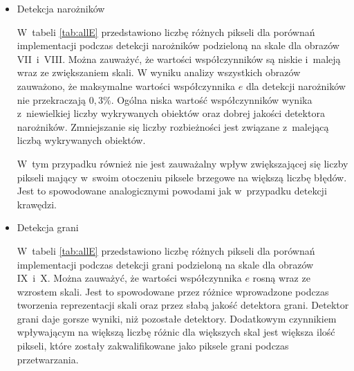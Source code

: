 \begin{itemize}
\item{Detekcja narożników}
\label{subsubsec:naroznikiTabele}

W~tabeli \ref{tab:allE} przedstawiono liczbę różnych pikseli dla porównań implementacji podczas detekcji narożników podzieloną na skale dla obrazów VII~i~VIII. Można zauważyć, że wartości współczynników są niskie i~maleją wraz ze zwiększaniem skali. W wyniku analizy wszystkich obrazów zauważono, że maksymalne wartości współczynnika $ e $ dla detekcji narożników nie przekraczają $ 0,3 \% $. Ogólna niska wartość współczynników wynika z~niewielkiej liczby wykrywanych obiektów oraz dobrej jakości detektora narożników. Zmniejszanie się liczby rozbieżności jest związane z~malejącą liczbą wykrywanych obiektów.

W~tym przypadku również nie jest zauważalny wpływ zwiększającej się liczby pikseli mający w~swoim otoczeniu piksele brzegowe na większą liczbę błędów. Jest to spowodowane analogicznymi powodami jak w~przypadku detekcji krawędzi.

\item{Detekcja grani}
\label{subsubsec:granieTabele}

W~tabeli \ref{tab:allE} przedstawiono liczbę różnych pikseli dla porównań implementacji podczas detekcji grani podzieloną na skale dla obrazów IX~i~X. Można zauważyć, że wartości współczynnika $ e $ rosną wraz ze wzrostem skali. Jest to spowodowane przez różnice wprowadzone podczas tworzenia reprezentacji skali oraz przez słabą jakość detektora grani. Detektor grani daje gorsze wyniki, niż pozostałe detektory. Dodatkowym czynnikiem wpływającym na większą liczbę różnic dla większych skal jest większa ilość pikseli, które zostały zakwalifikowane jako piksele grani podczas przetwarzania.
\end{itemize}